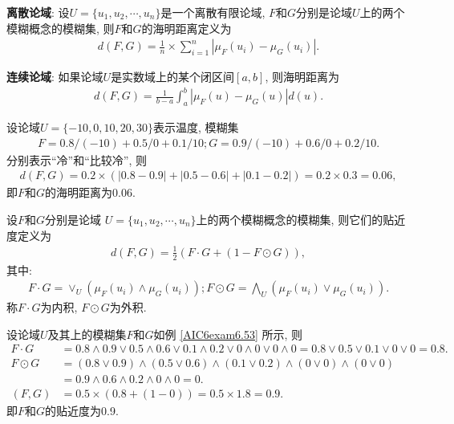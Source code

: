 \textbf{离散论域}: 设$U=\{u_1, u_2, \cdots, u_n\}$是一个离散有限论域, $F$和$G$分别是论域$U$上的两个模糊概念的模糊集, 则$F$和$G$的海明距离定义为
\begin{align}
    d(F, G)=\frac{1}{n} \times \sum_{i=1}^{n}\left|\mu_{F}\left(u_{i}\right)-\mu_{G}\left(u_{i}\right)\right|.
\end{align}

\textbf{连续论域}: 如果论域$U$是实数域上的某个闭区间$[a, b]$, 则海明距离为
\begin{align}
    d(F, G)=\frac{1}{b-a} \int_{a}^{b}\left|\mu_{F}(u)-\mu_{G}(u)\right| d(u).
\end{align}
\begin{example}\label{AIC6exam6.53}
设论域$U=\{-10, 0, 10, 20, 30\}$表示温度, 模糊集
\begin{align*}
    F= 0.8/(-10)+0.5/0+0.1/10; 
    G=0.9/(-10)+0.6/0+0.2/10.
\end{align*}
分别表示“冷”和“比较冷”, 则
\begin{align*}
    d(F,G)=0.2\times (|0.8-0.9|+|0.5-0.6|+|0.1-0.2|)=0.2\times 0.3=0.06,
\end{align*}
即$F$和$G$的海明距离为0.06.
\end{example}

设$F$和$G$分别是论域 $U=\{u_1, u_2, \cdots, u_n\}$上的两个模糊概念的模糊集, 则它们的贴近度定义为
\begin{align*}
    d(F, G)=\frac 1 2( F\cdot G+(1-F\odot G)),
\end{align*}
其中:
\begin{align*}
    F \cdot G=\vee_{U}\left(\mu_{F}\left(u_{i}\right) \wedge \mu_{G}\left(u_{i}\right)\right); 
    F \odot G=\bigwedge_{U}\left(\mu_{F}\left(u_{i}\right) \vee \mu_{G}\left(u_{i}\right)\right).
\end{align*}
称$F\cdot G$为内积, $F\odot G$为外积.
\begin{example}
设论域$U$及其上的模糊集$F$和$G$如例 \ref{AIC6exam6.53} 所示, 则
\begin{align*}
F\cdot G&=0.8\wedge 0.9\vee 0.5\wedge 0.6\vee 0.1\wedge 0.2 \vee  0\wedge 0\vee  0\wedge 0=0.8\vee 0.5\vee 0.1 \vee  0 \vee  0=0.8.\\
F\odot G&= (0.8\vee 0.9)\wedge (0.5\vee 0.6)\wedge (0.1\vee 0.2) \wedge (0\vee 0) \wedge (0\vee 0)\\
        &=0.9\wedge 0.6\wedge 0.2\wedge 0\wedge 0 =0.\\
(F, G)&=0.5\times (0.8+(1-0))=0.5\times 1.8=0.9.
\end{align*}
即$F$和$G$的贴近度为0.9.
\end{example}

